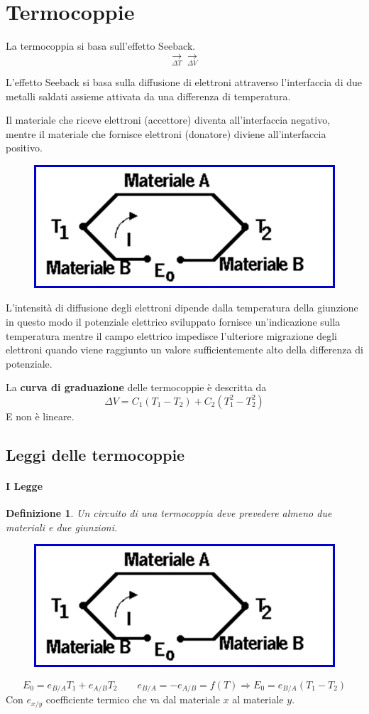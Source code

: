 \documentclass[a4paper, 15pt]{article}
\newtheorem*{definizione}{Definizione}
\begin{document}
\section{Termocoppie}
\begin{adjustwidth}{2in}{} 	
	La termocoppia si basa sull'effetto Seeback. 
	\[\underset{\Delta T}{\rightarrow} \boxed{} \underset{\Delta V}{\rightarrow}\]
	
	L'effetto Seeback si basa sulla diffusione di elettroni attraverso l'interfaccia di due metalli saldati assieme attivata da una differenza di temperatura. 
	
	Il materiale che riceve elettroni (accettore) diventa all'interfaccia negativo, mentre il materiale che fornisce elettroni (donatore) diviene all'interfaccia positivo. 
	\begin{figure}[H]
		\centering
		\includegraphics[width=0.2\linewidth]{immagini/screenshot019}
		\label{fig:screenshot019}
	\end{figure}	
	L'intensità di diffusione degli elettroni dipende dalla temperatura della giunzione in questo modo il potenziale elettrico sviluppato fornisce un'indicazione sulla temperatura mentre il campo elettrico impedisce l'ulteriore migrazione degli elettroni quando viene raggiunto un valore sufficientemente alto della differenza di potenziale. \newline 
	
	La \textbf{curva di graduazione} delle termocoppie è descritta da 
	\[\Delta V = C_1(T_1-T_2) + C_2(T_1^2-T_2^2)\]
	E non è lineare.
\end{adjustwidth}
\subsection{Leggi delle termocoppie}
\paragraph{I Legge}
\begin{definizione} 
	Un circuito di una termocoppia deve prevedere almeno due materiali e due giunzioni.
\end{definizione}

	\begin{figure}[H]
		\centering
		\includegraphics[width=0.5\linewidth]{immagini/screenshot020}
		\label{fig:screenshot020}
	\end{figure}
	\[E_0 = e_{B/A}T_1 + e_{A/B}T_2 \qquad  e_{B/A} = - e_{A/B} = f(T) \Rightarrow E_0 = e_{B/A}(T_1 - T_2)\]
	Con $e_{x/y}$ coefficiente termico che va dal materiale $x$ al materiale $y$.
\newpage
\end{document}

